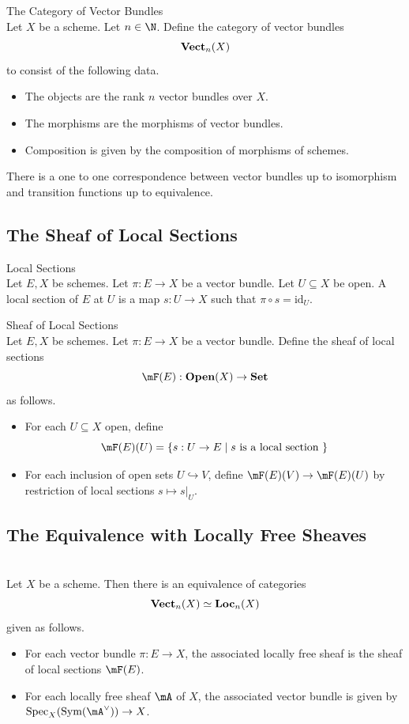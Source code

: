 \documentclass[a4paper]{article}
\begin{document}
\begin{defn}{The Category of Vector Bundles}{}\\
Let $X$ be a scheme. Let $n\in\N$. Define the category of vector bundles $$\bold{Vect}_n(X)$$ to consist of the following data. 
\begin{itemize}
\item The objects are the rank $n$ vector bundles over $X$. 
\item The morphisms are the morphisms of vector bundles. 
\item Composition is given by the composition of morphisms of schemes. 
\end{itemize}
\end{defn}

There is a one to one correspondence between vector bundles up to isomorphism and transition functions up to equivalence. 

\subsection{The Sheaf of Local Sections}
\begin{defn}{Local Sections}{}\\
Let $E,X$ be schemes. Let $\pi:E\to X$ be a vector bundle. Let $U\subseteq X$ be open. A local section of $E$ at $U$ is a map $s:U\to X$ such that $\pi\circ s=\text{id}_U$. 
\end{defn}

\begin{defn}{Sheaf of Local Sections}{}\\
Let $E,X$ be schemes. Let $\pi:E\to X$ be a vector bundle. Define the sheaf of local sections $$\mF(E):\bold{Open}(X)\to\bold{Set}$$ as follows. 
\begin{itemize}
\item For each $U\subseteq X$ open, define $$\mF(E)(U)=\{s:U\to E\;|\;s\text{ is a local section }\}$$
\item For each inclusion of open sets $U\hookrightarrow V$, define $\mF(E)(V)\to\mF(E)(U)$ by restriction of local sections $s\mapsto s|_U$. 
\end{itemize}
\end{defn}

\subsection{The Equivalence with Locally Free Sheaves}
\begin{prp}{}{}\\
Let $X$ be a scheme. Then there is an equivalence of categories $$\bold{Vect}_n(X)\simeq\bold{Loc}_n(X)$$ given as follows. 
\begin{itemize}
\item For each vector bundle $\pi:E\to X$, the associated locally free sheaf is the sheaf of local sections $\mF(E)$. 
\item For each locally free sheaf $\mA$ of $X$, the associated vector bundle is given by $\text{Spec}_X(\text{Sym}(\mA^\vee))\to X$. 
\end{itemize}
\end{prp}
\end{document}
